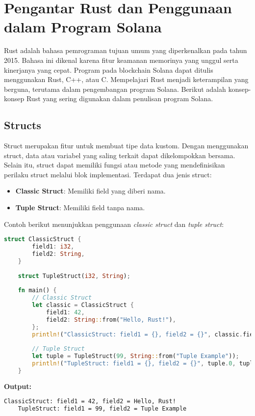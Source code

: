 \chapter{Pengantar Rust dan Penggunaan dalam Program Solana}

Rust adalah bahasa pemrograman tujuan umum yang diperkenalkan pada tahun 2015. Bahasa ini dikenal karena fitur keamanan memorinya yang unggul serta kinerjanya yang cepat. Program pada blockchain Solana dapat ditulis menggunakan Rust, C++, atau C. Mempelajari Rust menjadi keterampilan yang berguna, terutama dalam pengembangan program Solana. Berikut adalah konsep-konsep Rust yang sering digunakan dalam penulisan program Solana.

\section{Structs}

Struct merupakan fitur untuk membuat tipe data kustom. Dengan menggunakan struct, data atau variabel yang saling terkait dapat dikelompokkan bersama. Selain itu, struct dapat memiliki fungsi atau metode yang mendefinisikan perilaku struct melalui blok implementasi. Terdapat dua jenis struct:
\begin{itemize}
	\item \textbf{Classic Struct}: Memiliki field yang diberi nama.
	\item \textbf{Tuple Struct}: Memiliki field tanpa nama.
\end{itemize}

Contoh berikut menunjukkan penggunaan \textit{classic struct} dan \textit{tuple struct}:

\begin{lstlisting}[language=Rust, caption={Contoh Struct dalam Rust}]
	struct ClassicStruct {
		field1: i32,
		field2: String,
	}
	
	struct TupleStruct(i32, String);
	
	fn main() {
		// Classic Struct
		let classic = ClassicStruct {
			field1: 42,
			field2: String::from("Hello, Rust!"),
		};
		println!("ClassicStruct: field1 = {}, field2 = {}", classic.field1, classic.field2);
		
		// Tuple Struct
		let tuple = TupleStruct(99, String::from("Tuple Example"));
		println!("TupleStruct: field1 = {}, field2 = {}", tuple.0, tuple.1);
	}
\end{lstlisting}

\textbf{Output:}
\begin{lstlisting}[language=bash, caption={Output Program Struct}]
	ClassicStruct: field1 = 42, field2 = Hello, Rust!
	TupleStruct: field1 = 99, field2 = Tuple Example
\end{lstlisting}

